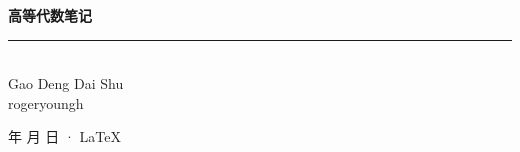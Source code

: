 \documentclass[cn,11pt,blue,normal,founder]{elegantbook}
\begin{document}
\newcommand\mfrac[2]{\dfrac{#1\smash[b]{\strut}}{#2\smash[t]{\strut}}}
\newcommand\RR{\mathbb{R}}
\newcommand\NN{\mathbb{N}}
\newcommand\QQ{\mathbb{Q}}
\newcommand\CC{\mathbb{C}}
\newcommand\ee{\mathrm{e}}
\newcommand\dd{\mathrm{d}}
\newcommand\rank{\mathrm{rank}}
\newcommand\uppi{\mathrm{\pi}}
\newcommand\aaa{\boldsymbol{\alpha}}
\newcommand\bbb{\boldsymbol{\beta}}
\newcommand\eee{\boldsymbol{\eta}}
\renewcommand\ggg{\boldsymbol{\gamma}}
\newcommand\ling{\boldsymbol{0}}

\begin{titlepage}
	\vspace*{25ex}%
	\begin{minipage}{.9\textwidth}
	\flushright
		{\textbf{高等代数笔记}}\\%
		\rule{\linewidth}{1pt}\\ \vspace{2ex}
		{\textsf{Gao Deng Dai Shu}} \\%
		\vspace{20ex}%
		{rogeryoungh}%
	\end{minipage}
	\vfill\centering
	{\number\year 年 \number\month 月 \number\day 日 · \LaTeX{}}
\end{titlepage}
\clearpage{\hypersetup{hidelinks}\tableofcontents}

\clearpage

\end{document}
